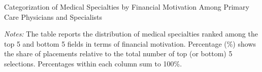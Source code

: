 \documentclass[11pt]{article}
\theoremstyle{definition}
\begin{document}
\begin{table}[H]
    \centering
    \caption{Categorization of Medical Specialties by Financial Motivation Among Primary Care Physicians and Specialists}
    \begin{adjustbox}{width=0.95\linewidth} 
    
    \end{adjustbox}
    \label{tab:med_field_cat_finmov}
          {\parbox{1\linewidth}{           %
		\scriptsize{{{ \textit{Notes:} The table reports the distribution of medical specialties ranked among the top 5 and bottom 5 fields in terms of financial motivation. Percentage (\%) shows the share of placements relative to the total number of top (or bottom) 5 selections. Percentages within each column sum to 100\%.}}}}}
\end{table}

\end{document}
